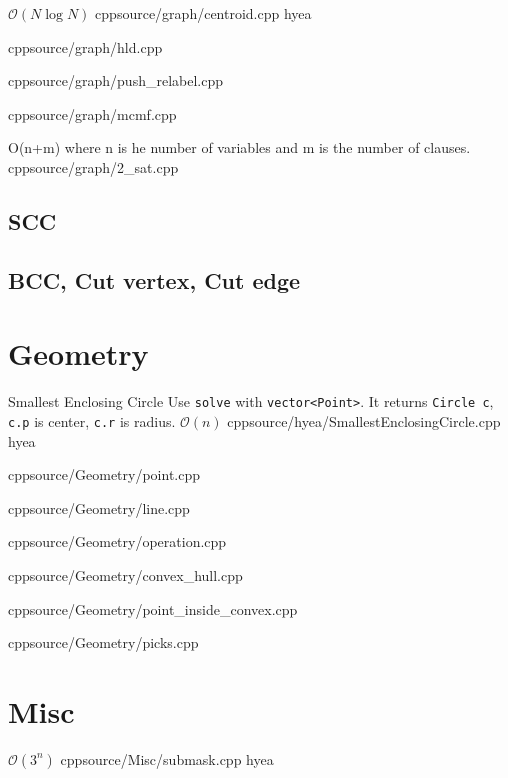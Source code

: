 \documentclass[landscape, 8pt, a4paper, oneside]{extarticle}
\begin{document}
\begin{multicols}{3}
{}
{$\mathcal{O}(N \log N)$}
{cpp}{source/graph/centroid.cpp}
{hyea}

{}
{}
{cpp}{source/graph/hld.cpp}

{}
{}
{cpp}{source/graph/push_relabel.cpp}

{}
{}
{cpp}{source/graph/mcmf.cpp}

{}
{O(n+m) where n is he number of variables and m is the number of clauses.}
{cpp}{source/graph/2_sat.cpp}

\subsection{SCC}
\added

\subsection{BCC, Cut vertex, Cut edge}

\added


\section{Geometry}

\Algorithm
{Smallest Enclosing Circle}
{Use \texttt{solve} with \texttt{vector<Point>}. It returns \texttt{Circle c}, \texttt{c.p} is center, \texttt{c.r} is radius.}
{$\mathcal{O}(n)$}
{cpp}{source/hyea/SmallestEnclosingCircle.cpp}
{hyea}

{}
{}
{cpp}{source/Geometry/point.cpp}

{}
{}
{cpp}{source/Geometry/line.cpp}

{}
{}
{cpp}{source/Geometry/operation.cpp}

{}
{}
{cpp}{source/Geometry/convex_hull.cpp}

{}
{}
{cpp}{source/Geometry/point_inside_convex.cpp}

{}
{}
{cpp}{source/Geometry/picks.cpp}

\section{Misc}

{}
{$\mathcal{O}(3^n)$}
{cpp}{source/Misc/submask.cpp}
{hyea}


\end{multicols}
\end{document}

